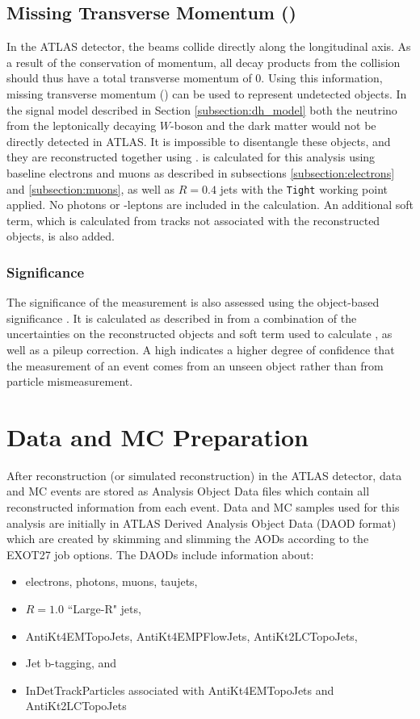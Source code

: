 \subsection{Missing Transverse Momentum (\met)}
In the ATLAS detector, the beams collide directly along the longitudinal axis. As a result of the conservation of momentum, all decay products from the collision should thus have a total transverse momentum of 0. Using this information, missing transverse momentum (\met) can be used to represent undetected objects. In the signal model described in Section \ref{subsection:dh_model} both the neutrino from the leptonically decaying $W$-boson and the dark matter would not be directly detected in ATLAS. It is impossible to disentangle these objects, and they are reconstructed together using \met. \met is calculated for this analysis using baseline electrons and muons as described in subsections \ref{subsection:electrons} and \ref{subsection:muons}, as well as $R=0.4$ jets with the \verb|Tight| working point applied. No photons or \tau-leptons are included in the calculation. An additional soft term, which is calculated from tracks not associated with the reconstructed objects, is also added.

\subsubsection{\met Significance}
The significance of the \met measurement is also assessed using the object-based \met significance \metsig. It is calculated as described in \cite{MetSig} from a combination of the uncertainties on the reconstructed objects and soft term used to calculate \met, as well as a pileup correction. A high \metsig indicates a higher degree of confidence that the \met measurement of an event comes from an unseen object rather than from particle mismeasurement.

\section{Data and MC Preparation}
After reconstruction (or simulated reconstruction) in the ATLAS detector, data and MC events are stored as Analysis Object Data files which contain all reconstructed information from each event. Data and MC samples used for this analysis are initially in ATLAS Derived Analysis Object Data (DAOD format) which are created by skimming and slimming the AODs according to the EXOT27 job options. The DAODs include information about:
\begin{itemize}
	\item electrons, photons, muons, taujets,
	\item $R=1.0$ ``Large-R" jets,
	\item AntiKt4EMTopoJets, AntiKt4EMPFlowJets, AntiKt2LCTopoJets,
  \item Jet b-tagging, and
	\item InDetTrackParticles associated with AntiKt4EMTopoJets and AntiKt2LCTopoJets
\end{itemize}

